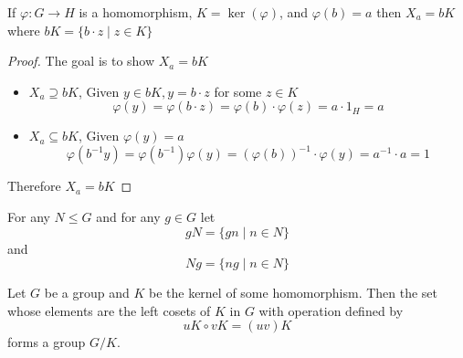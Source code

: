 \begin{lemma}
  If $\varphi: G \to H$ is a homomorphism, $K = \ker(\varphi)$, and $\varphi(b) = a$ 
  then $X_a = bK$ where $bK = \{b\cdot z \mid z \in K\}$
\end{lemma}

\begin{proof}
  The goal is to show $X_a = bK$
  \begin{itemize}
    \item $X_a \supseteq bK$, Given $y \in bK, y = b\cdot z$ for some $z \in K$
    \[\varphi(y) = \varphi(b\cdot z) = \varphi(b)\cdot\varphi(z) = a \cdot 1_H = a\]
    \item $X_a \subseteq bK$, Given $\varphi(y) = a$
    \[\varphi(b^{-1}y) = \varphi(b^{-1})\varphi(y) = (\varphi(b))^{-1}\cdot\varphi(y) = a^{-1}\cdot a = 1\]
  \end{itemize}
  Therefore $X_a = bK$
\end{proof}




\begin{definition}
  For any $N \le G$ and for any $g \in G$ let 
  \[gN = \{gn \mid n \in N\}\]
  and 
  \[Ng = \{ng \mid n \in N\}\]
\end{definition}

\begin{theorem}
  Let $G$ be a group and $K$ be the kernel of some homomorphism. 
  Then the set whose elements are the left cosets of $K$ in $G$ with operation defined by
  \[uK \circ vK = (uv)K\]
  forms a group $G/K$.
\end{theorem}

